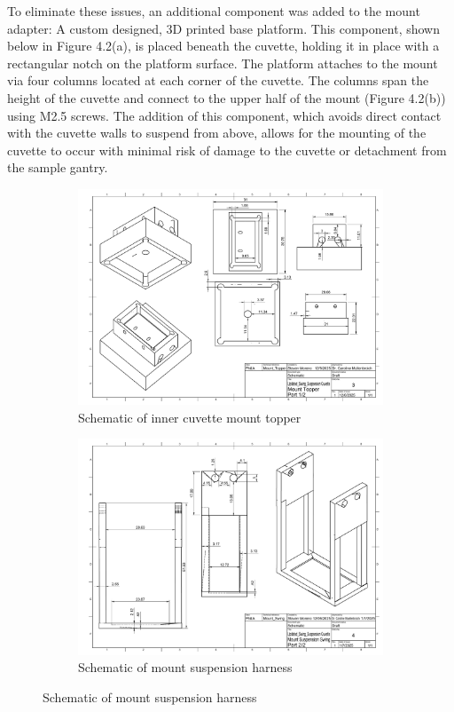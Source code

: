 To eliminate these issues, an additional component was added to the mount adapter: A custom designed, 3D printed base platform. This component, shown below in Figure 4.2(a), is placed beneath the cuvette, holding it in place with a rectangular notch on the platform surface. The platform attaches to the mount via four columns located at each corner of the cuvette. The columns span the height of the cuvette and connect to the upper half of the mount (Figure 4.2(b)) using M2.5 screws. The addition of this component, which avoids direct contact with the cuvette walls to suspend from above, allows for the mounting of the cuvette to occur with minimal risk of damage to the cuvette or detachment from the sample gantry. 

\begin{figure}[H]
    \centering
    \begin{subfigure}[b]{0.6\textwidth}
    \centering
    \includegraphics[width=1\linewidth]{Figures/Updated_Swing_Suspension Cuvette Topper Drawing v1.pdf}
    \caption{Schematic of inner cuvette mount topper}
    \end{subfigure}
    \medskip
    
    \begin{subfigure}[c]{0.6\textwidth}
    \centering
    \includegraphics[width=1\linewidth]{Figures/Updated_Swing_Suspension Cuvette Swing v1.pdf}
    \caption{Schematic of mount suspension harness}
    \end{subfigure}
    \medskip


\end{figure}
